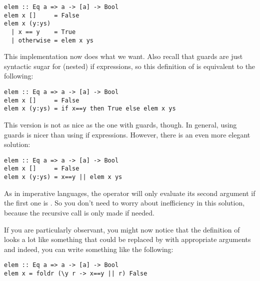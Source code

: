 \begin{verbatim}
elem :: Eq a => a -> [a] -> Bool
elem x []     = False
elem x (y:ys)
  | x == y    = True 
  | otherwise = elem x ys
\end{verbatim}
This implementation now does what we want. Also recall that guards are just syntactic sugar for (nested) if expressions, so this definition of  is equivalent to the following:
\begin{verbatim}
elem :: Eq a => a -> [a] -> Bool
elem x []     = False
elem x (y:ys) = if x==y then True else elem x ys
\end{verbatim}
This version is not as nice as the one with guards, though. In general, using guards is nicer than using if expressions. However, there is an even more elegant solution:
\begin{verbatim}
elem :: Eq a => a -> [a] -> Bool
elem x []     = False
elem x (y:ys) = x==y || elem x ys
\end{verbatim}
As in imperative languages, the \haskellIn{(||)} operator will only evaluate its second argument if the first one is . So you don't need to worry about inefficiency in this solution, because the recursive call is only made if needed. 

If you are particularly observant, you might now notice that the definition of  looks a lot like something that could be replaced by  with appropriate arguments and indeed, you can write something like the following:
\begin{verbatim}
elem :: Eq a => a -> [a] -> Bool
elem x = foldr (\y r -> x==y || r) False
\end{verbatim}

	
	

